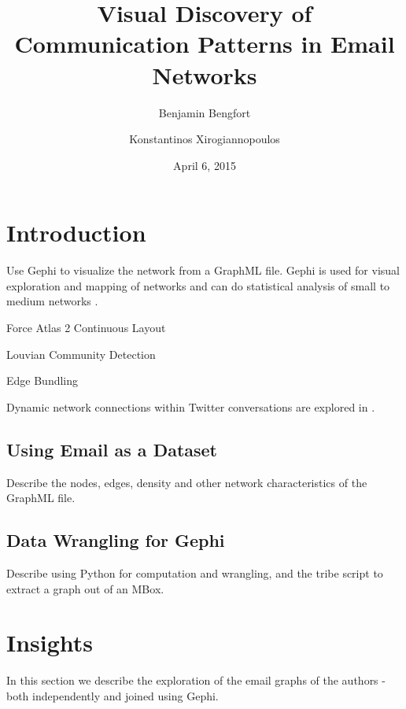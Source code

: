 \documentclass[11pt,letterpaper]{article}
\begin{document}
\title{Visual Discovery of Communication Patterns in Email Networks}

\author[ ]{Benjamin Bengfort}
\author[ ]{Konstantinos Xirogiannopoulos}

\date{April 6, 2015}

\maketitle

\section*{Introduction}

Use Gephi \cite{gephi_gephi-open_2010} to visualize the network from a GraphML \cite{brandes_graph_2010} file. Gephi is used for visual exploration and mapping of networks \cite{bastian_gephi:_2009} and can do statistical analysis of small to medium networks \cite{mcsweeney_gephi_2009}.

Force Atlas 2 Continuous Layout \cite{jacomy_forceatlas2_2014}

Louvian Community Detection \cite{de_meo_generalized_2011}

Edge Bundling \cite{pupyrev_edge_2012}

Dynamic network connections within Twitter conversations are explored in \cite{bruns_how_2012}.

\subsection*{Using Email as a Dataset}

Describe the nodes, edges, density and other network characteristics of the GraphML file.

\subsection*{Data Wrangling for Gephi}

Describe using Python for computation and wrangling, and the tribe script to extract a graph out of an MBox.

\section*{Insights}

In this section we describe the exploration of the email graphs of the authors - both independently and joined using Gephi.
\end{document}
